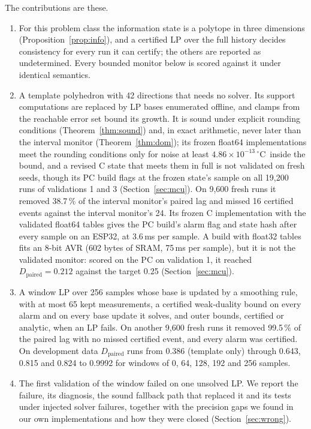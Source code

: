 \documentclass[11pt,a4paper]{article}
\newcommand{\degC}{\ensuremath{{}^\circ}C}
\newcommand{\sci}[2]{\ensuremath{#1\times10^{#2}}}
\newcommand{\Dp}{D_{\mathrm{paired}}}
\begin{document}
The contributions are these.
\begin{enumerate}
\item For this problem class the information state is a polytope in three dimensions
  (Proposition~\ref{prop:info}), and a certified LP over the full history decides consistency for every run it can certify; the others are
  reported as undetermined. Every
  bounded monitor below is scored against it under identical semantics.
\item A template polyhedron with 42 directions that needs no solver. Its support computations are replaced by LP bases
  enumerated offline, and clamps from the reachable error set bound its growth. It is sound
  under explicit rounding conditions (Theorem~\ref{thm:sound}) and, in exact arithmetic, never later than the interval
  monitor (Theorem~\ref{thm:dom}); its frozen float64 implementations meet the rounding conditions only for noise at least
  \sci{4.86}{-13}\,\degC\ inside the bound, and a revised C state that meets them in full is not validated on fresh
  seeds, though its PC build flags at the frozen state's sample on all 19,200 runs of validations 1 and 3
  (Section~\ref{sec:mcu}). On 9,600 fresh runs it
  removed 38.7\,\% of the interval monitor's paired lag and missed 16 certified events against the interval monitor's
  24. Its frozen C implementation with the validated float64 tables gives the PC build's alarm flag and state hash after every
  sample on an ESP32, at 3.6\,ms per sample. A build with float32 tables fits an 8-bit AVR (602 bytes of SRAM, 75\,ms per sample), but it is not the
  validated monitor: scored on the PC on validation 1, it reached $\Dp = 0.212$ against the target 0.25
  (Section~\ref{sec:mcu}).
\item A window LP over 256 samples whose base is updated by a smoothing rule, with at most 65 kept measurements, a
  certified weak-duality bound on every alarm and on every base update it solves, and outer bounds, certified or analytic, when an LP fails. On another 9,600 fresh runs it removed
  99.5\,\% of the paired lag with no missed certified event, and every alarm was certified. On development data $\Dp$ runs from
  0.386 (template only) through 0.643, 0.815 and 0.824 to 0.9992 for windows of 0, 64, 128, 192 and 256 samples.
\item The first validation of the window failed on one unsolved LP. We report the failure, its diagnosis, the sound
  fallback path that replaced it and its tests under injected solver failures, together with the precision gaps we
  found in our own implementations and how they were closed (Section~\ref{sec:wrong}).

\end{enumerate}
\end{document}
